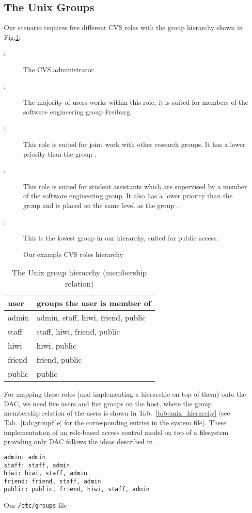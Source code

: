 \subsection{The Unix Groups}
Our scenario requires five different CVS roles with the group
hierarchy shown in Fig.\ref{fig:hierarchy}:
\begin{description}
\item[:] The CVS administrator.
\item[:] The majority of users works within this
  role, it is suited for members of the software engineering group Freiburg. 
\item[:] This role is suited for joint work with
  other research groups. It has a lower priority than the group 
  .
\item[:] This role is suited for student assistants
  which are supervised by a member of the software engineering
  group. It also has a lower priority than the group
   and is placed on the same level as the group
   .
\item[:] This is the lowest group in our hierarchy,
  suited for public access.  
\end{description}
\begin{figure}
    \centering
      \scalebox{0.5}{}
      \caption{Our example CVS roles hierarchy\label{fig:hierarchy}}
  \end{figure}
\begin{table}
\centering
\begin{tabular}{l|l}
\textbf{user} & \textbf{groups the user is member of}\\
\hline
admin & admin, staff, hiwi, friend, public\\
staff & staff, hiwi, friend, public\\
hiwi & hiwi, public\\
friend & friend, public\\
public & public\\
\end{tabular}
\caption{The Unix group hierarchy (membership relation)\label{tab:unix_hierarchy}}
\end{table}
For mapping %
these roles (and implementing a hierarchic \rbac{} on top of them) onto the \unix{} DAC, 
we need five users and five groups on the \unix{} host, where the group membership 
relation of the users is shown in Tab.~\vref{tab:unix_hierarchy} (see
Tab.~\vref{tab:groupfile} for the corresponding entries in the \unix{}
system  file). These implementation of an role-based access control 
model on top of a filesystem providing only DAC follows the ideas described in~\cite{sandhu.ea:decentralized:1998}.
\begin{table}
\centering
\begin{verbatim}
admin: admin
staff: staff, admin
hiwi: hiwi, staff, admin
friend: friend, staff, admin
public: public, friend, hiwi, staff, admin
\end{verbatim}
\caption{Our \texttt{/etc/groups} file\label{tab:groupfile}}
\end{table}


